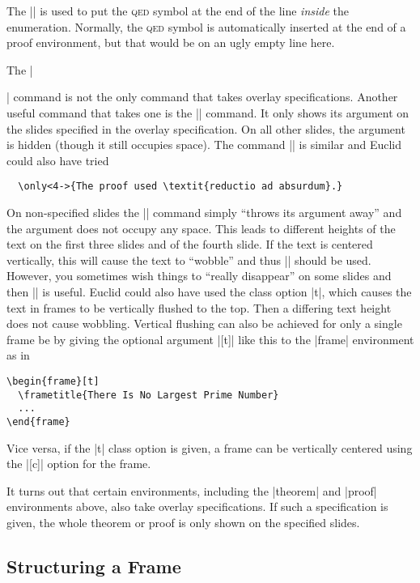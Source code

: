 The |\qedhere| is used to put the \textsc{qed} symbol at the end of
the line \emph{inside} the enumeration. Normally, the \textsc{qed}
symbol is automatically inserted at the end of a proof environment,
but that would be on an ugly empty line here.

The |\item| command is not the only command that takes overlay
specifications. Another useful command that takes one is the
|\uncover| command. It only shows its argument on the slides specified 
in the overlay specification. On all other slides, the argument is
hidden (though it still occupies space). The command |\only| is
similar and Euclid could also have tried
\begin{verbatim}
  \only<4->{The proof used \textit{reductio ad absurdum}.}
\end{verbatim}
On non-specified slides the |\only| command simply ``throws its
argument away'' and the argument does not occupy any space. This leads
to different heights of the text on the first three slides and of the
fourth slide. If the text is centered vertically, this will cause the
text to ``wobble'' and thus |\uncover| should be used. However, you
sometimes wish things to ``really disappear'' on some slides and then
|\only| is useful. Euclid could also have used the class option
|t|, which causes the text in frames to be vertically flushed
to the top. Then a differing text height does not cause
wobbling. Vertical flushing can also be achieved for only a single
frame be by giving the optional argument |[t]| like this to the
|frame| environment as in 
\begin{verbatim}
\begin{frame}[t]
  \frametitle{There Is No Largest Prime Number}
  ...
\end{frame}
\end{verbatim}
Vice versa, if the |t| class option is given, a frame can be
vertically centered using the |[c]| option for the frame.

It turns out that certain environments, including the |theorem| and
|proof| environments above, also take overlay specifications. If such
a specification is given, the whole theorem or proof is only shown on
the specified slides.


\subsection{Structuring a Frame}

